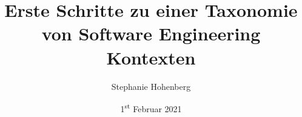 
\title{Erste Schritte zu einer Taxonomie von Software Engineering Kontexten} 
\newcommand{\Year}{2021}
\date{1\textsuperscript{st} Februar \Year}
\newcommand{\thesisKind}{Master}
\newcommand{\degree}{Master~of~Science}
\newcommand{\versionnumber}{0.1}

\author{Stephanie Hohenberg}
\newcommand{\matrikelno}{5293431}
\newcommand{\email}{stephanie.hohenberg@fu-berlin.de}

\newcommand{\supervisor}{Prof. Dr. Lutz Prechelt}
\newcommand{\supervisorUniversity}{Freie Universität Berlin}
\newcommand{\supervisorDepartment}{Dept. of Computer Science and Mathematics}
\newcommand{\supervisorAG}{Software Engineering Research Group}
\newcommand{\supervisorCountry}{Germany}

\newcommand{\fstAdvisor}{Prof. Dr. Lutz Prechelt}
\newcommand{\fstAdvisorsUniversity}{Freie Universität Berlin} 
\newcommand{\fstAdvisorsDepartment}{Dept. of Computer Science and Mathematics} 
\newcommand{\fstAdvisorsAG}{Software Engineering Research Group}
\newcommand{\fstAdvisorsCountry}{Germany}

\newcommand{\sndAdvisor}{Prof.~Dr.~XX~TODO}
\newcommand{\sndAdvisorsUniversity}{Freie Universität Berlin} %
\newcommand{\sndAdvisorsDepartment}{Dept. of Computer Science and Mathematics}
\newcommand{\sndAdvisorsAG}{XX TODO Group}
\newcommand{\sndAdvisorsCountry}{Germany}

\usepackage{float}








